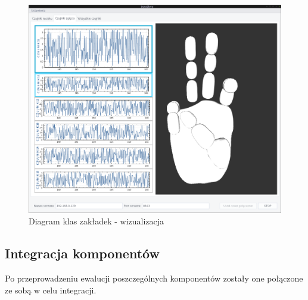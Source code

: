 \documentclass{article}
\begin{document}
\begin{figure}[H]
    \centering
    \includegraphics[width=18cm]{zakladka2.png}
    \caption{Diagram klas zakładek - wizualizacja}
    \label{rys:zakladka2}
\end{figure}

\subsection{Integracja komponentów}
Po przeprowadzeniu ewalucji poszczególnych komponentów zostały one połączone ze sobą w celu integracji.\\
\end{document}
